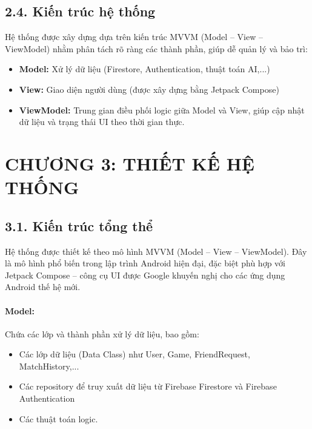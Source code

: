 \documentclass[a4paper,12pt]{article}
\begin{document}
\subsection*{2.4. Kiến trúc hệ thống} %

\justify
\noindent Hệ thống được xây dựng dựa trên kiến trúc MVVM (Model – View – ViewModel) nhằm phân tách rõ ràng các thành phần, giúp dễ quản lý và bảo trì:
\begin{itemize}[label=·]
    \item \textbf{Model:} Xử lý dữ liệu (Firestore, Authentication, thuật toán AI,...)
    \item \textbf{View:} Giao diện người dùng (được xây dựng bằng Jetpack Compose)
    \item \textbf{ViewModel:} Trung gian điều phối logic giữa Model và View, giúp cập nhật dữ liệu và trạng thái UI theo thời gian thực.
\end{itemize}

\section*{\centering \textbf{CHƯƠNG 3: THIẾT KẾ HỆ THỐNG}} %

\subsection*{3.1. Kiến trúc tổng thể} %

\justify
\noindent Hệ thống được thiết kế theo mô hình MVVM (Model – View – ViewModel). Đây là mô hình phổ biến trong lập trình Android hiện đại, đặc biệt phù hợp với Jetpack Compose – công cụ UI được Google khuyến nghị cho các ứng dụng Android thế hệ mới.

\paragraph{Model:} %
\noindent Chứa các lớp và thành phần xử lý dữ liệu, bao gồm:
\begin{itemize}[label=·]
    \item Các lớp dữ liệu (Data Class) như User, Game, FriendRequest, MatchHistory,...
    \item Các repository để truy xuất dữ liệu từ Firebase Firestore và Firebase Authentication
    \item Các thuật toán logic.
\end{itemize}
\end{document}
